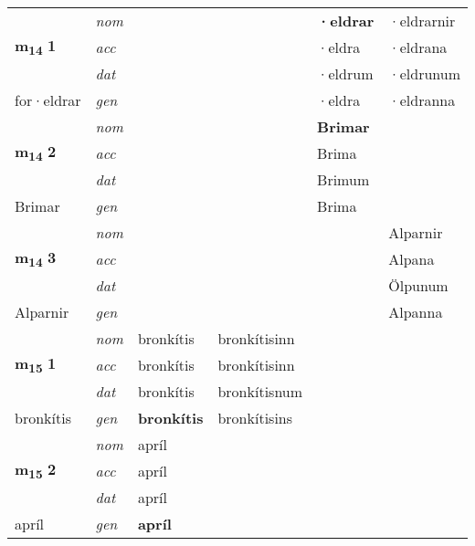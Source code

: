 \begin{longtable}[l]{X>{\footnotesize\itshape}XXXXX}
\multirow{3}{*}{{{\textbf{m{\textsubscript{14}}} \Large{\textbf{1}}}}} & nom &  &  & \textbf{·eldrar} & ·eldrarnir \\*
 & acc &  &  & ·eldra & ·eldrana \\*
 & dat &  &  & ·eldrum & ·eldrunum \\*
 {\footnotesize{for\allowbreak ·eldrar}} & gen & \textbf{} &  & ·eldra & ·eldranna \\
\midrule

\multirow{3}{*}{{{\textbf{m{\textsubscript{14}}} \Large{\textbf{2}}}}} & nom &  &  & \textbf{Brimar} &  \\*
 & acc &  &  & Brima &  \\*
 & dat &  &  & Brimum &  \\*
 {\footnotesize{Brimar}} & gen & \textbf{} &  & Brima &  \\
\midrule

\multirow{3}{*}{{{\textbf{m{\textsubscript{14}}} \Large{\textbf{3}}}}} & nom &  &  & \textbf{} & Alparnir \\*
 & acc &  &  &  & Alpana \\*
 & dat &  &  &  & Ölpunum \\*
 {\footnotesize{Alparnir}} & gen & \textbf{} &  &  & Alpanna \\
\midrule

\multirow{3}{*}{{{\textbf{m{\textsubscript{15}}} \Large{\textbf{1}}}}} & nom & bronkítis & bronkítisinn & \textbf{} &  \\*
 & acc & bronkítis & bronkítisinn &  &  \\*
 & dat & bronkítis & bronkítisnum &  &  \\*
 {\footnotesize{bronkítis}} & gen & \textbf{bronkítis} & bronkítisins &  &  \\
\midrule

\multirow{3}{*}{{{\textbf{m{\textsubscript{15}}} \Large{\textbf{2}}}}} & nom & apríl &  & \textbf{} &  \\*
 & acc & apríl &  &  &  \\*
 & dat & apríl &  &  &  \\*
 {\footnotesize{apríl}} & gen & \textbf{apríl} &  &  &  \\
\bottomrule
\end{longtable}
